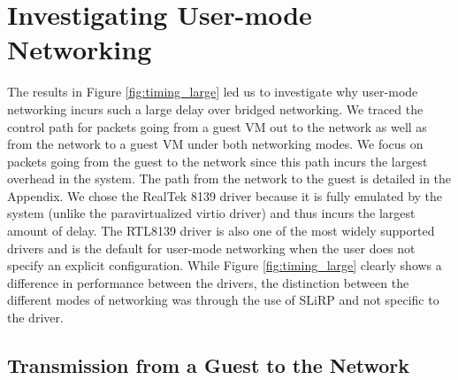 \section{Investigating User-mode Networking}
\label{sec:trace}

The results in Figure \ref{fig:timing_large} led us to investigate why user-mode networking incurs such a large delay over bridged networking.
We traced the control path for packets going from a guest VM out to the network as well as from the network to a guest VM under both networking modes.
We focus on packets going from the guest to the network since this path incurs the largest overhead in the system.
The path from the network to the guest is detailed in the Appendix. 
We chose the RealTek 8139 driver because it is fully emulated by the system (unlike the paravirtualized virtio driver) and thus incurs the largest amount of delay.
The RTL8139 driver is also one of the most widely supported drivers and is the default for user-mode networking when the user does not specify an explicit configuration.
While Figure \ref{fig:timing_large} clearly shows a difference in performance between the drivers, the distinction between the different modes of networking was through the use of SLiRP and not specific to the driver.
%
%

\subsection{Transmission from a Guest to the Network}
\label{subsec:usermode}

